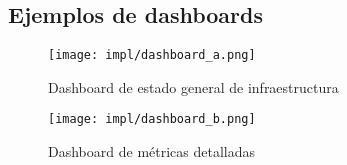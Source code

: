 \newpage{}
\subsection{Ejemplos de dashboards}
\begin{figure}[H]
	\centering
	\texttt{[image: impl/dashboard\_a.png]}
	\caption{Dashboard de estado general de infraestructura}
	\label{fig:dashboard_a}
\end{figure}

\begin{figure}[H]
	\centering
	\texttt{[image: impl/dashboard\_b.png]}
	\caption{Dashboard de métricas detalladas}
	\label{fig:dashboard_b}
\end{figure}
